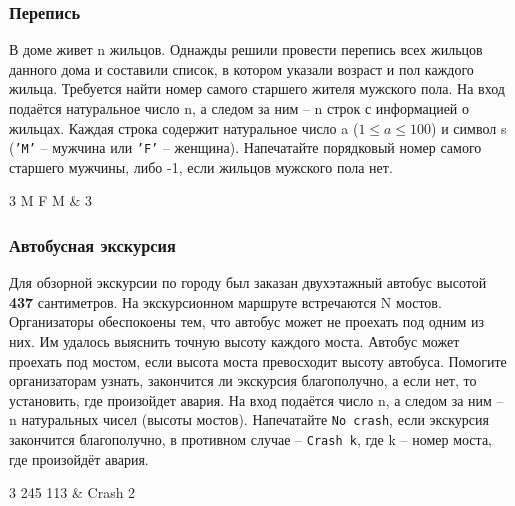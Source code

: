 \begin{frame}
	\frametitle{Перепись}
	В доме живет n жильцов. Однажды решили провести перепись всех жильцов данного
	дома и составили список, в котором указали возраст и пол каждого жильца.
	Требуется найти номер самого старшего жителя мужского пола. 
	\inp
	На вход подаётся натуральное число n, а следом за ним -- n строк с
	информацией о жильцах. Каждая строка содержит натуральное число a ($1 \leq a
	\leq 100$) и символ s ({\tt'M'} -- мужчина или {\tt'F'} -- женщина).
	\out
	Напечатайте порядковый номер самого старшего мужчины, либо -1, если жильцов
	мужского пола нет.
	\begin{ex}
		3  M  F  M & 3 \tb
	\end{ex}
\end{frame}

\begin{frame}
	\frametitle{Автобусная экскурсия}
	Для обзорной экскурсии по городу был заказан двухэтажный автобус высотой {\bf
	437} сантиметров. На экскурсионном маршруте встречаются N мостов.
	Организаторы обеспокоены тем, что автобус может не проехать под одним из них.
	Им удалось выяснить точную высоту каждого моста. Автобус может проехать под
	мостом, если высота моста превосходит высоту автобуса. Помогите организаторам
	узнать, закончится ли экскурсия благополучно, а если нет, то установить, где
	произойдет авария. 
	\inp
	На вход подаётся число n, а следом за ним -- n натуральных чисел (высоты мостов).
	\out
	Напечатайте {\tt No crash}, если экскурсия закончится благополучно, в противном
	случае -- {\tt Crash k}, где k -- номер моста, где произойдёт авария.
	\begin{ex}
		3  245 113 & Crash 2 \tb
	\end{ex}
\end{frame}


